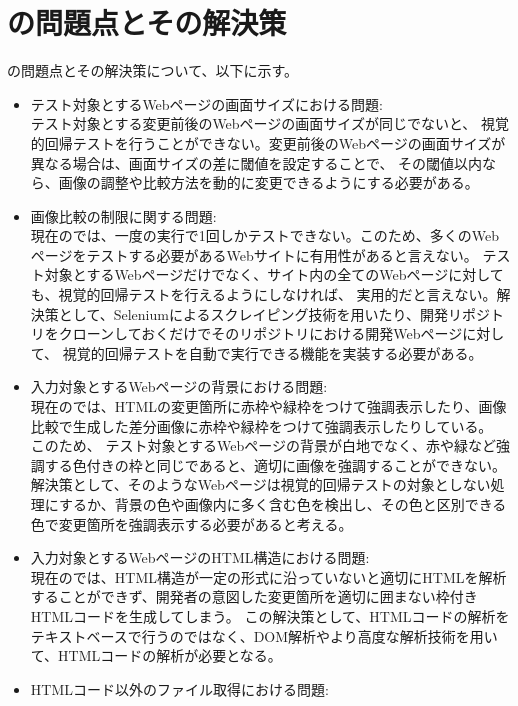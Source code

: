 \section{\toolName の問題点とその解決策}\label{sec:AWSAL_problems}
\toolName の問題点とその解決策について、以下に示す。
\begin{itemize}
    \item テスト対象とするWebページの画面サイズにおける問題:\\
          テスト対象とする変更前後のWebページの画面サイズが同じでないと、
          視覚的回帰テストを行うことができない。変更前後のWebページの画面サイズが異なる場合は、画面サイズの差に閾値を設定することで、
          その閾値以内なら、画像の調整や比較方法を動的に変更できるようにする必要がある。
    \item 画像比較の制限に関する問題:\\
          現在の\toolName では、一度の実行で1回しかテストできない。このため、多くのWebページをテストする必要があるWebサイトに有用性があると言えない。
          テスト対象とするWebページだけでなく、サイト内の全てのWebページに対しても、視覚的回帰テストを行えるようにしなければ、
          実用的だと言えない。解決策として、Seleniumによるスクレイピング技術を用いたり、開発リポジトリをクローンしておくだけでそのリポジトリにおける開発Webページに対して、
          視覚的回帰テストを自動で実行できる機能を実装する必要がある。
    \item 入力対象とするWebページの背景における問題:\\
          現在の\toolName では、HTMLの変更箇所に赤枠や緑枠をつけて強調表示したり、画像比較で生成した差分画像に赤枠や緑枠をつけて強調表示したりしている。
          このため、
          テスト対象とするWebページの背景が白地でなく、赤や緑など強調する色付きの枠と同じであると、適切に画像を強調することができない。
          解決策として、そのようなWebページは視覚的回帰テストの対象としない処理にするか、背景の色や画像内に多く含む色を検出し、その色と区別できる色で変更箇所を強調表示する必要があると考える。
    \item 入力対象とするWebページのHTML構造における問題:\\
          現在の\toolName では、HTML構造が一定の形式に沿っていないと適切にHTMLを解析することができず、開発者の意図した変更箇所を適切に囲まない枠付きHTMLコードを生成してしまう。
          この解決策として、HTMLコードの解析をテキストベースで行うのではなく、DOM解析やより高度な解析技術を用いて、HTMLコードの解析が必要となる。
    \item HTMLコード以外のファイル取得における問題:\\

\end{itemize}
